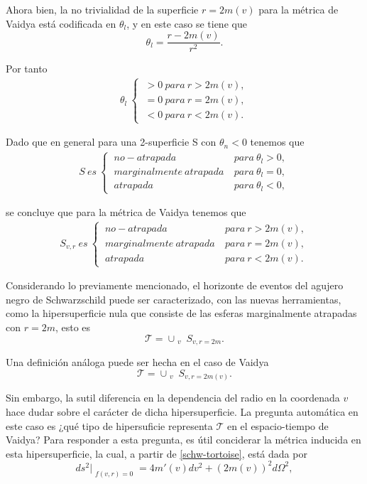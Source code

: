 \documentclass[16pt,a4paper]{article}
\numberwithin{equation}{section}
\theoremstyle{definition}
\begin{document}
Ahora bien, la no trivialidad de la superficie $r = 2m(v)$ para la métrica de Vaidya está codificada en $\theta_l$, y en este caso se tiene que
\begin{equation*}
\theta_l = \frac{r - 2m(v)}{r^2}.
\end{equation*} 

Por tanto
\begin{align*}
\theta_l\ 
\begin{cases}
\ >0\ para\ r>2m(v),\\
\ =0\ para\ r=2m(v),\\
\ <0\ para\ r<2m(v).
\end{cases}
\end{align*}

Dado que en general para una 2-superficie S con $\theta_n < 0$ tenemos que 
\begin{align*}
S\ es\ 
\begin{cases}
\ no-atrapada\ & para\ \theta_l>0,\\
\ marginalmente\ atrapada\ & para\ \theta_l=0,\\
\ atrapada\ & para\ \theta_l<0,
\end{cases}
\end{align*}

se concluye que para la métrica de Vaidya tenemos que 
\begin{align*}
S_{v,r}\ es\ 
\begin{cases}
\ no-atrapada\ & para\ r>2m(v),\\
\ marginalmente\ atrapada\ & para\ r=2m(v),\\
\ atrapada\ & para\ r<2m(v).
\end{cases}
\end{align*}

Considerando lo previamente mencionado, el horizonte de eventos del agujero negro de Schwarzschild puede ser caracterizado, con las nuevas herramientas, como la hipersuperficie nula que consiste de las esferas marginalmente atrapadas con $r = 2m$, esto es
\begin{equation*}
\mathcal{T} = \cup_{\substack{v}}S_{v,r = 2m}.
\end{equation*}

Una definición análoga puede ser hecha en el caso de Vaidya  
\begin{equation*}
\mathcal{T} = \cup_{\substack{v}}S_{v,r = 2m(v)}.
\end{equation*}

Sin embargo, la sutil diferencia en la dependencia del radio en la coordenada $v$ hace dudar sobre el carácter de dicha hipersuperficie. La pregunta automática en este caso es ¿qué tipo de hipersuficie representa $\mathcal{T}$ en el espacio-tiempo de Vaidya? Para responder a esta pregunta, es útil conciderar la métrica inducida en esta hipersuperficie, la cual, a partir de \eqref{schw-tortoise}, está dada por\\
\begin{equation}
\label{ind vaiya}
ds^2|_{\substack{f(v,r)=0}} = 4m'(v)dv^2 + (2m(v))^2d\Omega^2,
\end{equation}
\end{document}
